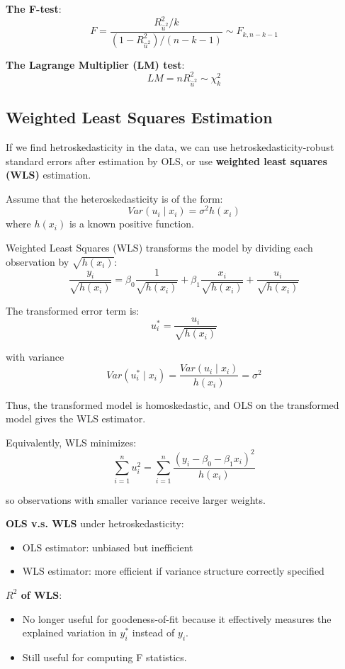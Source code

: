 \documentclass[11pt,a4paper]{article}
\begin{document}
\textbf{The F-test}:
\[
F = \frac{R_{\hat{u}^2}^2 /k}{(1 -R_{\hat{u}^2}^2)/(n - k - 1)} \sim F_{k, n-k-1}
\]

\textbf{The Lagrange Multiplier (LM) test}:
\[
LM = n R_{\hat{u}^2}^2 \sim \chi_k^2
\]

\subsection{Weighted Least Squares Estimation}
If we find hetroskedasticity in the data, we can use hetroskedasticity-robust standard errors after estimation by OLS, or use \textbf{weighted least squares (WLS)} estimation. \par

Assume that the heteroskedasticity is of the form:
\[
Var(u_i \mid x_i)=\sigma^2 h(x_i)
\]
where $h(x_i)$ is a known positive function. \par

Weighted Least Squares (WLS) transforms the model by dividing each observation by $\sqrt{h(x_i)}$:
\[
\frac{y_i}{\sqrt{h(x_i)}} = \beta_0\frac{1}{\sqrt{h(x_i)}} + \beta_1\frac{x_i}{\sqrt{h(x_i)}} + \frac{u_i}{\sqrt{h(x_i)}}
\]

The transformed error term is:
\[
u_i^*=\frac{u_i}{\sqrt{h(x_i)}}
\]

with variance
\[
Var(u_i^* \mid x_i) = \frac{Var(u_i \mid x_i)}{h(x_i)} = \sigma^2
\]

Thus, the transformed model is homoskedastic, and OLS on the transformed model gives the WLS estimator. \par

Equivalently, WLS minimizes:
\[
\sum_{i=1}^n u_i^2 = \sum_{i=1}^n\frac{(y_i-\beta_0-\beta_1x_i)^2}{h(x_i)} 
\]

so observations with smaller variance receive larger weights. \par

\textbf{OLS v.s. WLS} under hetroskedasticity:
\begin{itemize}
    \item OLS estimator: unbiased but inefficient
    \item WLS estimator: more efficient if variance structure correctly specified
\end{itemize}

\textbf{$R^2$ of WLS}:
\begin{itemize}
    \item No longer useful for goodeness-of-fit because it effectively measures the explained variation in $y_i^*$ instead of $y_i$.
    \item Still useful for computing F statistics.
\end{itemize}
\end{document}
